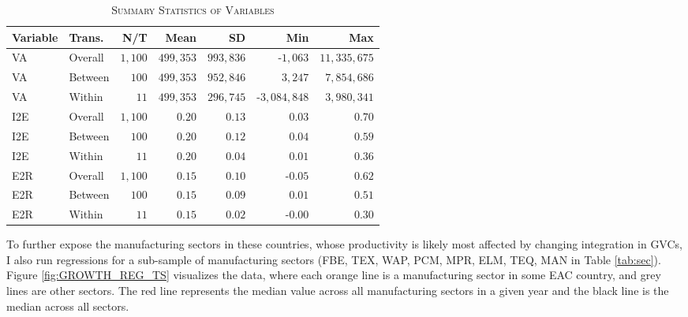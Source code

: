 \documentclass[a4paper]{article}
\begin{document}
\begin{table}[h!] \centering 
  \caption{\label{tab:SUMM_GROWTH}\textsc{Summary Statistics of Variables}}
  \begin{center}
\begin{tabular}{ llrrrrr} \toprule
Variable & Trans. & N/T & Mean & SD & Min & Max \\ \midrule
VA & Overall & $1,100$ & $499,353$ & $993,836$ & -$1,063$ & $11,335,675$ \\ 
VA & Between & $100$ & $499,353$ & $952,846$ & $3,247$ & $7,854,686$ \\ 
VA & Within & $11$ & $499,353$ & $296,745$ & -$3,084,848$ & $3,980,341$ \\ 
I2E & Overall & $1,100$ & $0.20$ & $0.13$ & $0.03$ & $0.70$ \\ 
I2E & Between & $100$ & $0.20$ & $0.12$ & $0.04$ & $0.59$ \\ 
I2E & Within & $11$ & $0.20$ & $0.04$ & $0.01$ & $0.36$ \\ 
E2R & Overall & $1,100$ & $0.15$ & $0.10$ & -$0.05$ & $0.62$ \\ 
E2R & Between & $100$ & $0.15$ & $0.09$ & $0.01$ & $0.51$ \\ 
E2R & Within & $11$ & $0.15$ & $0.02$ & -$0.00$ & $0.30$ \\ \bottomrule
\end{tabular} 
 \end{center}
\end{table} 
\FloatBarrier 

To further expose the manufacturing sectors in these countries, whose productivity is likely most affected by changing integration in GVCs, I also run regressions for a sub-sample of manufacturing sectors (FBE, TEX, WAP, PCM, MPR, ELM, TEQ, MAN in Table \ref{tab:sec}). Figure \ref{fig:GROWTH_REG_TS} visualizes the data, where each orange line is a manufacturing sector in some EAC country, and grey lines are other sectors. The red line represents the median value across all manufacturing sectors in a given year and the black line is the median across all sectors.  
\end{document}
